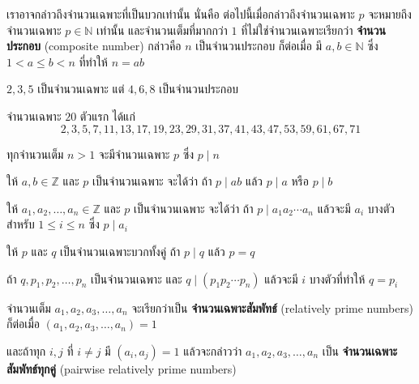 \begin{agreementbox}
	เราอาจกล่าวถึงจำนวนเฉพาะที่เป็นบวกเท่านั้น นั่นคือ ต่อไปนี้เมื่อกล่าวถึงจำนวนเฉพาะ $p$ จะหมายถึงจำนวนเฉพาะ $p \in \mathbb{N}$ เท่านั้น และจำนวนเต็มที่มากกว่า $1$ ที่ไม่ใช่จำนวนเฉพาะเรียกว่า \textbf{จำนวนประกอบ} (composite number) กล่าวคือ $n$ เป็นจำนวนประกอบ ก็ต่อเมื่อ มี $a, b \in \mathbb{N}$ ซึ่ง $1 < a \leq b < n$ ที่ทำให้ $n = ab$
\end{agreementbox}

\begin{examplebox}
	$2, 3, 5$ เป็นจำนวนเฉพาะ แต่ $4, 6, 8$ เป็นจำนวนประกอบ
\end{examplebox}

\begin{examplebox}
	จำนวนเฉพาะ $20$ ตัวแรก ได้แก่
	\[ 2, 3, 5, 7, 11, 13, 17, 19, 23, 29, 31, 37, 41, 43, 47, 53, 59, 61, 67, 71 \]
\end{examplebox}

\begin{theorembox}
	ทุกจำนวนเต็ม $n > 1$ จะมีจำนวนเฉพาะ $p$ ซึ่ง $p \mid n$
\end{theorembox}

\begin{theorembox}
	ให้ $a, b \in \mathbb{Z}$ และ $p$ เป็นจำนวนเฉพาะ จะได้ว่า ถ้า $p \mid ab$ แล้ว $p \mid a$ หรือ $p \mid b$
\end{theorembox}

\begin{theorembox}
	ให้ $a_1, a_2, \ldots, a_n \in \mathbb{Z}$ และ $p$ เป็นจำนวนเฉพาะ จะได้ว่า ถ้า $p \mid a_1 a_2 \cdots a_n$ แล้วจะมี $a_i$ บางตัวสำหรับ $1 \leq i \leq n$ ซึ่ง $p \mid a_i$
\end{theorembox}

\begin{lemmabox}
	ให้ $p$ และ $q$ เป็นจำนวนเฉพาะบวกทั้งคู่ ถ้า $p \mid q$ แล้ว $p = q$
\end{lemmabox}

\begin{theorembox}
	ถ้า $q, p_1, p_2, \ldots, p_n$ เป็นจำนวนเฉพาะ และ $q \mid (p_1 p_2 \cdots p_n)$ แล้วจะมี $i$ บางตัวที่ทำให้ $q = p_i$
\end{theorembox}

\newpage
\begin{definitionbox} \label{definition3.3}
	จำนวนเต็ม $a_1, a_2, a_3, \ldots, a_n$ จะเรียกว่าเป็น \textbf{จำนวนเฉพาะสัมพัทธ์} (relatively prime numbers) ก็ต่อเมื่อ $(a_1, a_2, a_3, \ldots, a_n) = 1$ 
	
	และถ้าทุก $i, j$ ที่ $i \neq j$ มี $(a_i, a_j) = 1$ แล้วจะกล่าวว่า $a_1, a_2, a_3, \ldots, a_n$ เป็น \textbf{จำนวนเฉพาะสัมพัทธ์ทุกคู่} (pairwise relatively prime numbers)
\end{definitionbox}

